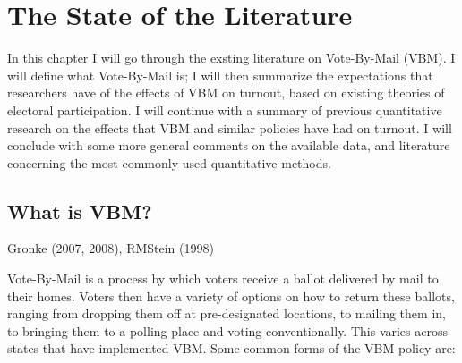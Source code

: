 \documentclass[12pt,twoside]{reedthesis}
\begin{document}
  \chapter{The State of the Literature}\label{rmd-basics}
  
  In this chapter I will go through the exsting literature on Vote-By-Mail
  (VBM). I will define what Vote-By-Mail is; I will then summarize the
  expectations that researchers have of the effects of VBM on turnout,
  based on existing theories of electoral participation. I will continue
  with a summary of previous quantitative research on the effects that VBM
  and similar policies have had on turnout. I will conclude with some more
  general comments on the available data, and literature concerning the
  most commonly used quantitative methods.
  
  \section{What is VBM?}\label{what-is-vbm}
  
  Gronke (2007, 2008), RMStein (1998)
  
  Vote-By-Mail is a process by which voters receive a ballot delivered by
  mail to their homes. Voters then have a variety of options on how to
  return these ballots, ranging from dropping them off at pre-designated
  locations, to mailing them in, to bringing them to a polling place and
  voting conventionally. This varies across states that have implemented
  VBM. Some common forms of the VBM policy are:
  
\end{document}
